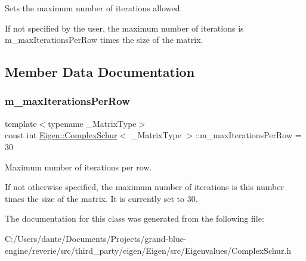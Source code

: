 Sets the maximum number of iterations allowed. 

If not specified by the user, the maximum number of iterations is m\+\_\+max\+Iterations\+Per\+Row times the size of the matrix. 

\subsection{Member Data Documentation}
\mbox{\label{class_eigen_1_1_complex_schur_ad37ef6058ce690a1fac4cc524b70cbf0}} 
\subsubsection{\texorpdfstring{m\_maxIterationsPerRow}{m\_maxIterationsPerRow}}
{\footnotesize\ttfamily template$<$typename \+\_\+\+Matrix\+Type$>$ \\
const int \mbox{\hyperlink{class_eigen_1_1_complex_schur}{Eigen\+::\+Complex\+Schur}}$<$ \+\_\+\+Matrix\+Type $>$\+::m\+\_\+max\+Iterations\+Per\+Row = 30\hspace{0.3cm}{\ttfamily [static]}}



Maximum number of iterations per row. 

If not otherwise specified, the maximum number of iterations is this number times the size of the matrix. It is currently set to 30. 

The documentation for this class was generated from the following file\+:\begin{DoxyCompactItemize}
\item 
C\+:/\+Users/dante/\+Documents/\+Projects/grand-\/blue-\/engine/reverie/src/third\+\_\+party/eigen/\+Eigen/src/\+Eigenvalues/Complex\+Schur.\+h\end{DoxyCompactItemize}
